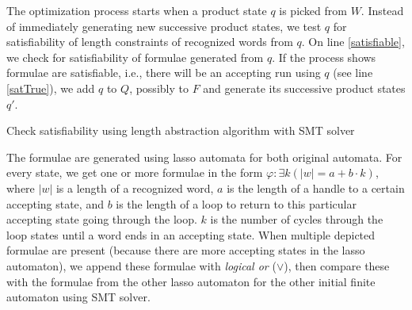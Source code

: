 The optimization process starts when a product state $q$ is picked from $W$. Instead of immediately generating new successive product states, we test $q$ for satisfiability of length constraints of recognized words from $q$. On line \ref{satisfiable}, we check for satisfiability of formulae generated from $q$. If the process shows formulae are satisfiable, i.e., there will be an accepting run using $q$ (see line \ref{satTrue}), we add $q$ to $Q$, possibly to $F$ and generate its successive product states $q'$.

\begin{algorithm}
\caption{Check satisfiability using length abstraction algorithm with SMT solver}\label{checkLengthAbstractionSatisfiabilitySMTAlgorithm}
%

\DontPrintSemicolon
\BlankLine


\end{algorithm}

The formulae are generated using lasso automata for both original automata. For every state, we get one or more formulae in the form $\varphi: \exists k( |w| = a + b \cdot k)$, where $|w|$ is a length of a recognized word, $a$ is the length of a handle to a certain accepting state, and $b$ is the length of a loop to return to this particular accepting state going through the loop. $k$ is the number of cycles through the loop states until a word ends in an accepting state. When multiple depicted formulae are present (because there are more accepting states in the lasso automaton), we append these formulae with \emph{logical or} ($\lor$), then compare these with the formulae from the other lasso automaton for the other initial finite automaton using SMT solver.


